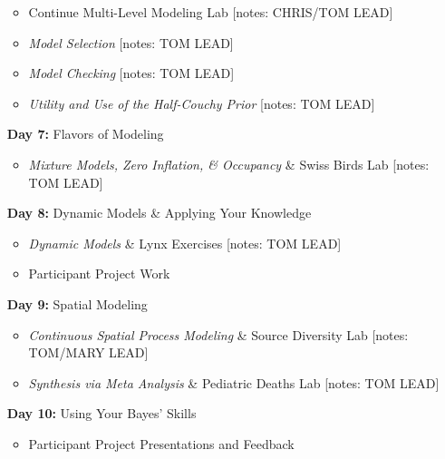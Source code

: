 \documentclass[11pt]{article}
\begin{document}
\begin{enumerate}
\begin{itemize}
\item  Continue Multi-Level Modeling Lab  [notes: CHRIS/TOM LEAD]
\item \emph{Model Selection} [notes: TOM LEAD]
\item \emph{Model Checking} [notes: TOM LEAD] 
\item \emph{Utility and Use of the Half-Couchy Prior} [notes: TOM LEAD]
\end{itemize}

\item[\textbf{Day 7:}] Flavors of Modeling

\begin{itemize}
\item \emph{Mixture Models, Zero Inflation, \& Occupancy} \& Swiss Birds Lab [notes: TOM LEAD]
\end{itemize}

\item[\textbf{Day 8:}] Dynamic Models \& Applying Your Knowledge

\begin{itemize}
\item \emph{Dynamic Models} \& Lynx Exercises [notes: TOM LEAD]
\item Participant Project Work
\end{itemize}

\item[\textbf{Day 9:}] Spatial Modeling

\begin{itemize}
\item \emph{Continuous Spatial Process Modeling} \& Source Diversity Lab [notes: TOM/MARY LEAD]
\item \emph{Synthesis via Meta Analysis} \& Pediatric Deaths Lab [notes: TOM LEAD] 
\end{itemize}

\item[\textbf{Day 10:}] Using Your Bayes' Skills

\begin{itemize}
\item Participant Project Presentations and Feedback 
\end{itemize}

\end{enumerate}
\end{document}

